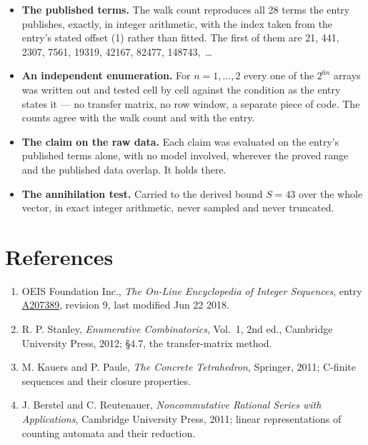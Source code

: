 \documentclass[11pt]{article}
\theoremstyle{definition}
\begin{document}
\begin{itemize}

\item {\bfseries The published terms.} The walk count reproduces all 28 terms the entry publishes, exactly, in integer arithmetic, with the index taken from the entry's stated offset (1) rather than fitted. The first of them are 21, 441, 2307, 7561, 19319, 42167, 82477, 148743,~\dots

\item {\bfseries An independent enumeration.} For $n = 1,\dots,2$ every one of the $2^{6n}$ arrays was written out and tested cell by cell against the condition as the entry states it --- no transfer matrix, no row window, a separate piece of code. The counts agree with the walk count and with the entry.

\item {\bfseries The claim on the raw data.} Each claim was evaluated on the entry's published terms alone, with no model involved, wherever the proved range and the published data overlap. It holds there.

\item {\bfseries The annihilation test.} Carried to the derived bound $S = 43$ over the whole vector, in exact integer arithmetic, never sampled and never truncated.

\end{itemize}

\section{References}

\begin{enumerate}

\item OEIS Foundation Inc., \emph{The On-Line Encyclopedia of Integer Sequences}, entry \href{https://oeis.org/A207389}{A207389}, revision 9, last modified Jun 22 2018.

\item R. P. Stanley, \emph{Enumerative Combinatorics}, Vol.~1, 2nd ed., Cambridge University Press, 2012; \S4.7, the transfer-matrix method.

\item M. Kauers and P. Paule, \emph{The Concrete Tetrahedron}, Springer, 2011; C-finite sequences and their closure properties.

\item J. Berstel and C. Reutenauer, \emph{Noncommutative Rational Series with Applications}, Cambridge University Press, 2011; linear representations of counting automata and their reduction.

\end{enumerate}
\end{document}
